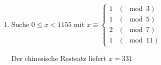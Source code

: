 \begin{enumerate}
\begin{enumerate}
		\item
		Suche $0 \leq x < 1155$ mit
		$x \equiv \begin{cases}
			1 & (\mod 3) \\
			1 & (\mod 5) \\
			2 & (\mod 7) \\
			1 & (\mod 11)
			\end{cases}$ 
			
		Der chinesische Restsatz liefert $x = 331$
	\end{enumerate}
	
\end{enumerate}
























